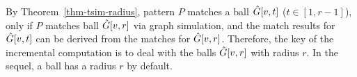 By Theorem~\ref{thm-tsim-radius}, pattern $P$ matches a ball $\hat{G}{[v, t]}$ ($t \in [1,r-1]$), only if $P$ matches ball $\hat{G}{[v, r]}$ via graph simulation,
and the match results for $\hat{G}{[v, t]}$ can be derived from the matches for $\hat{G}{[v, r]}$.
Therefore, the key of the incremental computation is to deal with the balls $\hat{G}{[v, r]}$ with radius $r$.
In the sequel, a ball has a radius $r$ by default.


